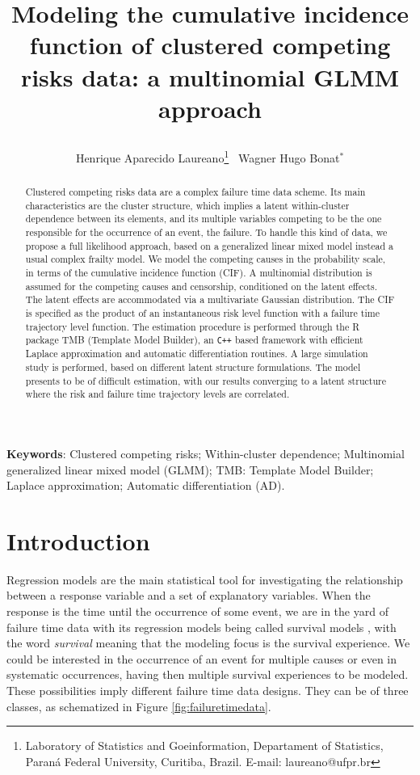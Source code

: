 \documentclass[a4paper,12pt]{article}
\title{
  
  Modeling the cumulative incidence function of clustered competing
  risks data: a multinomial GLMM approach

}
\author{
  Henrique Aparecido Laureano\thanks{
    Laboratory of Statistics and Goeinformation,
    Departament of Statistics,
    Paran\'{a} Federal University, Curitiba, Brazil.
    E-mail: laureano@ufpr.br
  }~
  Wagner Hugo Bonat$^\ast$}
\begin{document}
\maketitle

\begin{abstract}

  Clustered competing risks data are a complex failure time data
  scheme. Its main characteristics are the cluster structure, which
  implies a latent within-cluster dependence between its elements, and
  its multiple variables competing to be the one responsible for the
  occurrence of an event, the failure. To handle this kind of data, we
  propose a full likelihood approach, based on a generalized linear
  mixed model instead a usual complex frailty model. We model the
  competing causes in the probability scale, in terms of the cumulative
  incidence function (CIF). A multinomial distribution is assumed for
  the competing causes and censorship, conditioned on the latent
  effects. The latent effects are accommodated via a multivariate
  Gaussian distribution. The CIF is specified as the product of an
  instantaneous risk level function with a failure time trajectory level
  function. The estimation procedure is performed through the R package
  TMB (Template Model Builder), an \texttt{C++} based framework with
  efficient Laplace approximation and automatic differentiation
  routines. A large simulation study is performed, based on different
  latent structure formulations. The model presents to be of difficult
  estimation, with our results converging to a latent structure where
  the risk and failure time trajectory levels are correlated.

\end{abstract}

\begin{flushleft}
 \textbf{Keywords}: 
 Clustered competing risks;
 Within-cluster dependence;
 Multinomial generalized linear mixed model (GLMM);
 TMB: Template Model Builder;
 Laplace approximation;
 Automatic differentiation (AD).                    
\end{flushleft}

\section{Introduction}

Regression models are the main statistical tool for investigating the
relationship between a response variable and a set of explanatory
variables. When the response is the time until the occurrence of some
event, we are in the yard of failure time data with its regression
models being called survival models \citep{kalb&prentice}, with the word
\textit{survival} meaning that the modeling focus is the survival
experience. We could be interested in the occurrence of an event for
multiple causes or even in systematic occurrences, having then multiple
survival experiences to be modeled. These possibilities imply different
failure time data designs. They can be of three classes, as schematized
in Figure \ref{fig:failuretimedata}.
\end{document}
